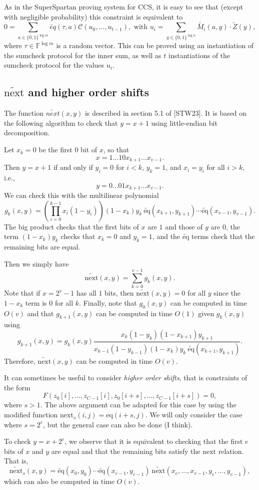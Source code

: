 \documentclass[a4paper]{article}
\begin{document}
As in the SuperSpartan proving system for CCS, it is easy to see that (except with negligible probability) this constraint is equivalent to 
$$
0 = \sum_{a \in \{0,1\}^{\log m}} \widetilde{eq}(\tau,a) \mathcal{C}\left( u_0, \dots, u_{t-1}\right), \text{ with } u_i= \sum_{y \in \{0,1\}^{\log n}} \widetilde{M_i}(a,y)\cdot \widetilde{Z}(y),
$$
where $\tau\in \mathbb{F}^{\log m}$ is a random vector. This can be proved using an instantiation of the sumcheck protocol for the inner sum, as well as $t$ instantiations of the sumcheck protocol for the values $u_i$. 

\subsection*{$\widetilde{\text{next}}$ and higher order shifts}
The function $\widetilde{next}(x,y)$ is described in section 5.1 of [STW23]. It is based on the following algorithm to check that $y=x+1$ using little-endian bit decomposition.

Let $x_k=0$ be the first $0$ bit of $x$, so that $$x=1\dots 1 0 x_{k+1}\dots x_{v-1}.$$ Then $y=x+1$ if and only if $y_i=0$ for $i<k$, $y_k=1$, and $x_i=y_i$ for all $i>k$, i.e., $$y=0\dots 0 1 x_{k+1}\dots x_{v-1}.$$
We can check this with the multilinear polynomial
$$g_k(x,y) = \left(\prod_{i=0}^{k-1} x_i(1-y_i)\right)(1-x_k) y_k\ \widetilde{\text{eq}}(x_{k+1},y_{k+1})\cdots \widetilde{\text{eq}}(x_{v-1},y_{v-1}).$$
The big product checks that the first bits of $x$ are $1$ and those of $y$ are $0$, the term $(1-x_k)y_k$ checks that $x_k=0$ and $y_k=1$, and the $\widetilde{\text{eq}}$ terms check that the remaining bits are equal.

Then we simply have
$$ \widetilde{\text{next}}(x,y) = \sum_{k=0}^{v-1}g_k(x,y).$$
Note that if $x=2^v-1$ has all $1$ bits, then $\widetilde{\text{next}}(x,y)=0$ for all $y$ since the $1-x_k$ term is $0$ for all $k$. Finally, note that $g_0(x,y)$ can be computed in time $O(v)$ and that $g_{k+1}(x,y)$ can be computed in time $O(1)$ given $g_k(x,y)$ using 
$$ g_{k+1}(x,y) = g_k(x,y)\frac{x_k (1-y_k)(1-x_{k+1})y_{k+1}}{x_{k-1}(1-y_{k-1})(1-x_k)y_k\ \widetilde{\text{eq}}(x_{k+1},y_{k+1})}.$$
Therefore, $\widetilde{\text{next}}(x,y)$ can be computed in time $O(v)$.

$$ $$
It can sometimes be useful to consider \emph{higher order shifts}, that is constraints of the form
$$
F(z_0[i],\dots,z_{C-1}[i],z_0[i+s],\dots,z_{C-1}[i+s])=0,
$$
where $s>1$. The above argument can be adapted for this case by using the modified function $\text{next}_s(i,j)=\text{eq}(i+s, j)$. We will only consider the case where $s=2^e$, but the general case can also be done (I think).

To check $y=x+2^e$, we observe that it is equivalent to checking that the first $e$ bits of $x$ and $y$ are equal and that the remaining bits satisfy the $\text{next}$ relation. That is,
$$\widetilde{\text{next}}_s(x,y)=\widetilde{\text{eq}}(x_{0},y_{0})\cdots \widetilde{\text{eq}}(x_{e-1},y_{e-1})\ \widetilde{\text{next}}(x_e,\dots,x_{v-1},y_e,\dots,y_{v-1}),$$
which can also be computed in time $O(v)$.





\end{document}
